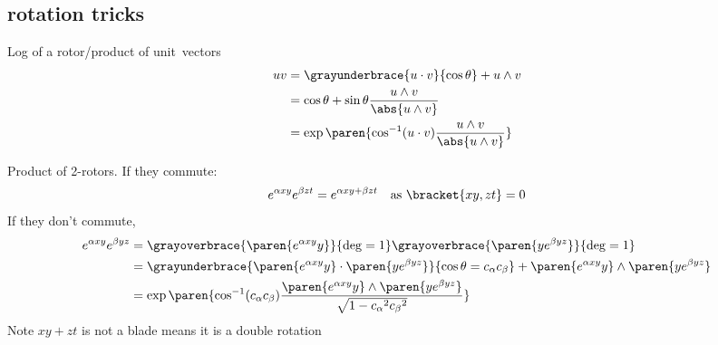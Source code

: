 \documentclass{scrartcl}
\begin{document}
\begin{multicols*}{2}
\section{rotation tricks}
Log of a rotor/product of unit~vectors
\begin{align*}
  uv &= \grayunderbrace{u\cdot v}{\cos\theta} + u\wedge v  \\
     &= \cos\theta + \sin\theta \frac{u\wedge v}{\abs{u\wedge v}} \\
     &= \exp\paren{\cos^{-1}(u\cdot v) \frac{u\wedge v}{\abs{u\wedge v}}}
\end{align*}

Product of 2-rotors. If they commute:
\[
  e^{\alpha xy} e^{\beta zt} = e^{\alpha xy + \beta zt} \quad \text{as } \bracket{xy,zt} = 0
\]
If they don't commute,
\begin{align*}
  e^{\alpha xy} e^{\beta yz}
  &= \grayoverbrace{\paren{e^{\alpha xy} y}}{\deg=1}\grayoverbrace{\paren{ye^{\beta yz}}}{\deg=1} \\
  &=\grayunderbrace{\paren{e^{\alpha xy} y} \cdot \paren{ye^{\beta yz}}}{\cos \theta=c_\alpha c_\beta} + \paren{e^{\alpha xy} y} \wedge \paren{ye^{\beta yz}} \\
  &=\exp\paren{\cos^{-1}(c_\alpha c_\beta) \frac{\paren{e^{\alpha xy}y}\wedge\paren{ye^{\beta yz}}}{\sqrt{1-{c_\alpha}^2{c_\beta}^2}}}
\end{align*}
Note \(xy+zt\) is not a blade means it is a double rotation


\end{multicols*}
\end{document}
